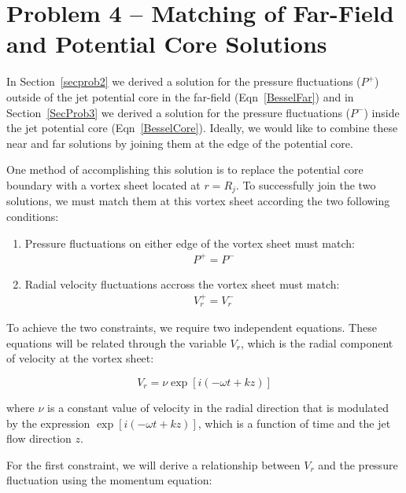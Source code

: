 \documentclass[]{aiaa-tc}%
\begin{document}
\section{Problem 4 -- Matching of Far-Field and Potential Core Solutions}

In Section~\ref{secprob2} we derived a solution for the pressure fluctuations ($P^+$) outside of the jet potential core in the far-field (Eqn~\ref{BesselFar}) and in Section~\ref{SecProb3} we derived a solution for the pressure fluctuations ($P^-$) inside the jet potential core (Eqn~\ref{BesselCore}).  Ideally, we would like to combine these near and far solutions by joining them at the edge of the potential core.

One method of accomplishing this solution is to replace the potential core boundary with a vortex sheet located at $r = R_j$.  To successfully join the two solutions, we must match them at this vortex sheet according the two following conditions:

\begin{enumerate}
  \item Pressure fluctuations on either edge of the vortex sheet must match:
        \begin{align}
          P^+ = P^-
        \end{align}
  \item Radial velocity fluctuations accross the vortex sheet must match:
        \begin{align}
          V_r^+ = V_r^-
        \end{align}
\end{enumerate}

To achieve the two constraints, we require two independent equations. These equations will be related through the variable $V_r$, which is the radial component of velocity at the vortex sheet:

\begin{equation}
V_r = \nu \exp[i(-\omega t + kz)]
\end{equation}

\noindent where $\nu$ is a constant value of velocity in the radial direction that is modulated by the expression $\exp[i(-\omega t + kz)]$, which is a function of time and the jet flow direction $z$.

For the first constraint, we will derive a relationship between $V_r$ and the pressure fluctuation using the momentum equation:
\end{document}
